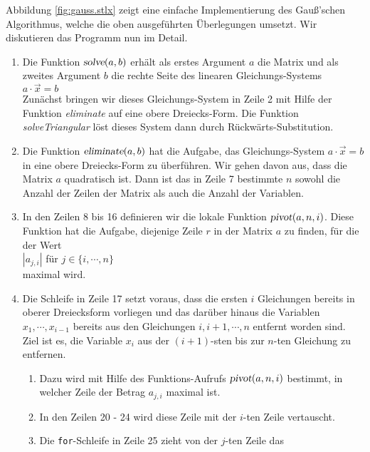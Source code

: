 \noindent
Abbildung \ref{fig:gauss.stlx} zeigt eine einfache Implementierung des Gauß'schen Algorithmus, welche die
oben ausgeführten Überlegungen umsetzt.  Wir diskutieren das Programm nun im Detail.
\begin{enumerate}
\item Die Funktion $\textsl{solve}(a, b)$ erhält als erstes Argument $a$ die Matrix und
      als zweites Argument $b$ die rechte Seite des linearen Gleichungs-Systems
      \\[0.2cm]
      \hspace*{1.3cm}
      $a \cdot \vec{x} = b$
      \\[0.2cm]
      Zunächst bringen wir dieses Gleichungs-System in Zeile 2 mit Hilfe der Funktion \textsl{eliminate} auf
      eine obere Dreiecks-Form.  Die Funktion \textsl{solveTriangular} löst dieses System dann durch
      Rückwärts-Substitution.
\item Die Funktion $\textsl{eliminate}(a, b)$ hat die Aufgabe, das Gleichungs-System $a \cdot \vec{x} = b$
      in eine obere Dreiecks-Form zu überführen.  Wir gehen davon aus, dass die Matrix $a$ quadratisch ist. 
      Dann ist das in Zeile 7 bestimmte $n$ sowohl die Anzahl der Zeilen der Matrix als auch die Anzahl
      der Variablen.
\item In den Zeilen 8 bis 16 definieren wir die lokale Funktion $\textsl{pivot}(a, n, i)$.  Diese Funktion 
      hat die Aufgabe, diejenige Zeile $r$ in der Matrix $a$ zu finden, für die der Wert
      \\[0.2cm]
      \hspace*{1.3cm}
      $|a_{j,i}|$ \quad für $j \in \{i, \cdots, n \}$
      \\[0.2cm]
      maximal wird.
\item Die Schleife in Zeile 17 setzt voraus, dass die ersten $i$ Gleichungen bereits in oberer 
      Dreiecksform vorliegen und das darüber hinaus die Variablen $x_1, \cdots, x_{i-1}$
      bereits aus den Gleichungen $i, i+1, \cdots, n$  entfernt worden sind.
      Ziel ist es,  die Variable $x_i$ aus der $(i+1)$-sten bis zur $n$-ten
      Gleichung zu entfernen.  
      \begin{enumerate}
      \item Dazu wird  mit Hilfe des Funktions-Aufrufs $\textsl{pivot}(a,n,i)$
            bestimmt, in welcher Zeile der Betrag $a_{j,i}$ maximal ist.
      \item In den Zeilen 20 - 24 wird diese Zeile  mit der $i$-ten Zeile vertauscht.
      \item Die \texttt{for}-Schleife in Zeile 25 zieht von der $j$-ten Zeile das

\end{enumerate}
\end{enumerate}
